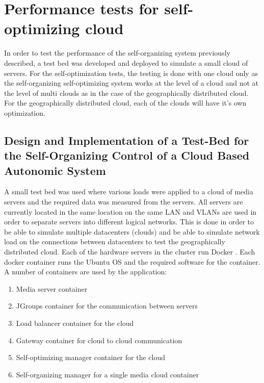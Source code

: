 \chapter{Performance tests for self-optimizing cloud} %
\label{Chapter5}

In order to test the performance of the self-organizing system previously described, a test bed was developed and deployed to simulate a small cloud of servers. For the self-optimization tests, the testing is done with one cloud only as the self-organizing self-optimizing system works at the level of a cloud and not at the level of multi clouds as in the case of the geographically distributed cloud. For the geographically distributed cloud, each of the clouds will have it's own optimization.

\section{Design and Implementation of a Test-Bed for the Self-Organizing Control of a Cloud Based Autonomic System}

A small test bed was used where various loads were applied to a cloud of media servers and the required data was measured from the servers. All servers are currently located in the same location on the same LAN and VLANs are used in order to separate servers into different logical networks. This is done in order to be able to simulate multiple datacenters (clouds) and be able to simulate network load on the connections between datacenters to test the geographically distributed cloud. Each of the hardware servers in the cluster run Docker \cite{cloud:docker}. Each docker container runs the Ubuntu OS and the required software for the container. A number of containers are used by the application:

\begin{enumerate}
	\item Media server container
	\item JGroups container for the communication between servers
	\item Load balancer container for the cloud
	\item Gateway container for cloud to cloud communication
	\item Self-optimizing manager container for the cloud
	\item Self-organizing manager for a single media cloud container
\end{enumerate}

